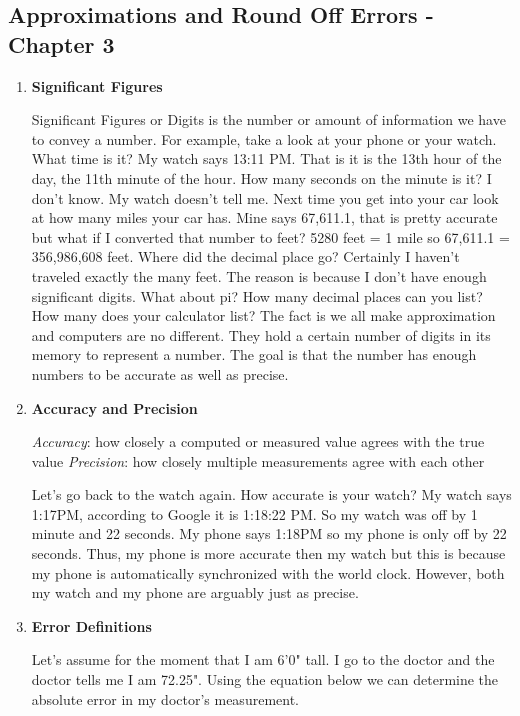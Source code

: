 \subsection{Approximations and Round Off Errors - Chapter 3}

\begin{enumerate}
  
  \item {\bf Significant Figures}
  
   Significant Figures or Digits is the number or amount of
   information we have to convey a number. For example, take a look at
   your phone or your watch. What time is it? My watch says 13:11
   PM. That is it is the 13th hour of the day, the 11th minute of the
   hour. How many seconds on the minute is it? I don't know. My watch
   doesn't tell me. Next time you get into your car look at how many
   miles your car has. Mine says 67,611.1, that is pretty accurate but
   what if I converted that number to feet? 5280 feet = 1 mile so
   67,611.1 = 356,986,608 feet. Where did the decimal place go?
   Certainly I haven't traveled exactly the many feet. The reason is
   because I don't have enough significant digits. What about pi? How
   many decimal places can you list? How many does your calculator
   list? The fact is we all make approximation and computers are no
   different. They hold a certain number of digits in its memory to 
   represent a number. The goal is that the number has enough numbers
   to be accurate as well as precise.

   \item {\bf Accuracy and Precision}

     {\it Accuracy}: how closely a computed or measured value agrees
     with the true value
     {\it Precision}: how closely multiple measurements agree with
     each other

     Let's go back to the watch again. How accurate is your watch? My
     watch says 1:17PM, according to Google it is 1:18:22 PM. So my
     watch was off by 1 minute and 22 seconds. My phone says 1:18PM so
     my phone is only off by 22 seconds. Thus, my phone is more
     accurate then my watch but this is because my phone is
     automatically synchronized with the world clock. However, both my
     watch and my phone are arguably just as precise.

  \item {\bf Error Definitions} 

    Let's assume for the moment that I am 6'0" tall. I go to the
    doctor and the doctor tells me I am 72.25". Using the equation
    below we can determine the absolute error in my doctor's measurement.


\end{enumerate}
